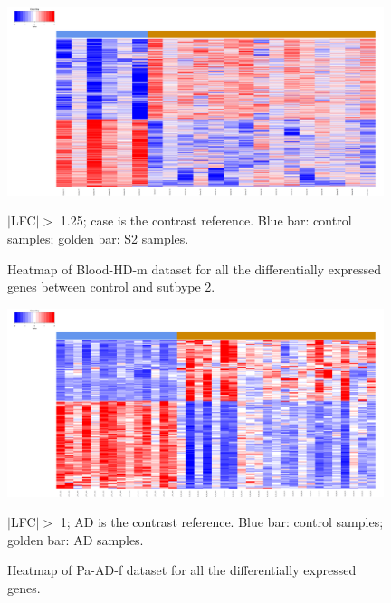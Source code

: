 \begin{figure}[!ht]
    \centerline{\includegraphics[width = 11cm]{Figures/DE heatmap/CTLvs2_HD-Blood-m_all.png}}
\caption{Heatmap of Blood-HD-m dataset for all the differentially expressed genes between control and sutbype 2.}
\footnotesize $|$LFC$| >$ 1.25; case is the contrast reference. Blue bar: control samples; golden bar: S2 samples.
\end{figure}


\begin{figure}[!ht]
    \centerline{\includegraphics[width = 11cm]{Figures/DE heatmap/CTLvsAD-Pa-f_all.png}}
\caption{Heatmap of Pa-AD-f dataset for all the differentially expressed genes.}
\label{DE-pa-ad-f}
\footnotesize $|$LFC$| >$ 1; AD is the contrast reference. Blue bar: control samples; golden bar: AD samples.
\end{figure}


